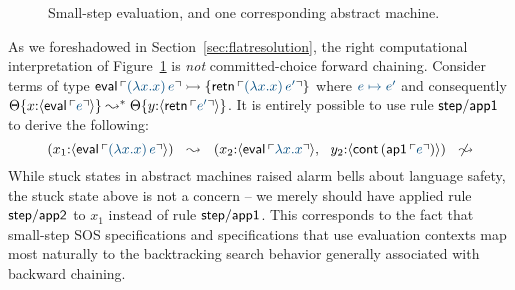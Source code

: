\begin{figure}[tp]
\begin{minipage}[b]{0.9\linewidth}
\end{minipage}
\caption{Small-step evaluation, and one corresponding abstract machine.}
\label{fig:cbv-sos}
\end{figure}



As we
foreshadowed in Section~\ref{sec:flatresolution}, the right
computational interpretation of Figure~\ref{fig:cbv-sos} is {\it not}
committed-choice forward chaining. Consider terms of type ${\sf
  eval}\,\interp{(\lambda x.x)\,e} \lefti \{ {\sf
  retn}\,\interp{(\lambda x.x)\,e'} \}$ where $\obj{e \mapsto e'}$ and
consequently $\tackon{\Theta}{x{:}\susp{{\sf eval}\,\interp{e}}}
\leadsto^* \tackon{\Theta}{y{:}\susp{{\sf retn}\,\interp{e'}}}$.
It is entirely possible to use rule ${\sf step/app1}$ to
derive the following:
\[
  (x_1{:}\susp{{\sf eval}\,\interp{(\lambda x.x)\,e}})
   ~~ \leadsto ~~
  (x_2{:}\susp{{\sf eval}\,\interp{\lambda x.x}}, ~~
  y_2{:}\susp{{\sf cont}\,({\sf ap1}\,\interp{e})})
   ~~ \not\leadsto
\]
While stuck states in abstract machines raised alarm bells about
language safety, the stuck state above is not a concern -- we merely
should have applied rule ${\sf step/app2}$ to $x_1$ instead
of rule ${\sf step/app1}$. This
corresponds to the fact that small-step SOS specifications and
specifications that use evaluation contexts 
map most naturally to the backtracking
search behavior generally associated with backward chaining. 



